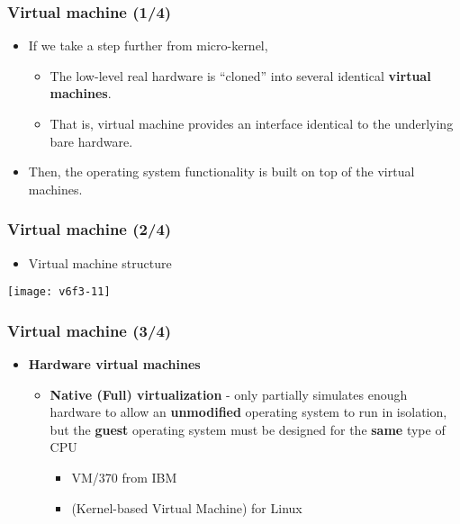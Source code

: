 \documentclass[CJKutf8,xcolor=pdftex,dvipsnames,table]{beamer}
\begin{document}
\begin{CJK*}{UTF8}{song}
  \begin{frame}
    \frametitle{Virtual machine (1/4)} \pause
    \begin{itemize}
    \item{If we take a step further from micro-kernel,} \pause
      \begin{itemize}
      \item{The low-level real hardware is ``cloned'' into several identical \textbf{virtual machines}.} \pause
      \item{That is, virtual machine provides an interface identical to the underlying bare hardware.} \pause
      \end{itemize}
    \item{Then, the operating system functionality is built on top of the virtual machines.}
    \end{itemize}
  \end{frame}
  
  \begin{frame}
    \frametitle{Virtual machine (2/4)} \pause
    \begin{itemize}
    \item{Virtual machine structure} \pause
    \end{itemize}
    \begin{center}
      \texttt{[image: v6f3-11]}
    \end{center}
  \end{frame}

  \begin{frame}
    \frametitle{Virtual machine (3/4)} \pause
    \begin{itemize}
      \item{\textbf{Hardware virtual machines}} \pause
        \begin{itemize}
    		\item{\textbf{Native (Full) virtualization} \pause - only partially simulates enough hardware to allow an \textbf{unmodified} operating system to run in isolation, but the \textbf{guest} operating system must be designed for the \textbf{same} type of CPU} \pause
    			\begin{itemize}
    			\item{VM/370 from IBM} \pause
    			\item{ (Kernel-based Virtual Machine) for Linux} \pause
    			\end{itemize}
			

\end{itemize}
\end{itemize}
\end{frame}
\end{CJK*}
\end{document}
